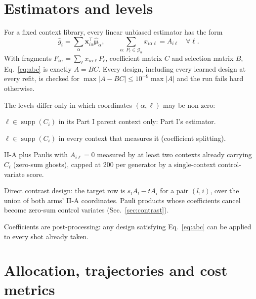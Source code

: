 \documentclass[10.5pt]{article}
\newcommand{\supp}{\operatorname{supp}}
\begin{document}
\section{Estimators and levels}
\label{sec:levels}

For a fixed context library, every linear unbiased estimator has the form
\begin{equation}
  \hat g_i=\sum_\alpha\bm x_{i\alpha}^{\!\top}\hat{\bm\mu}_\alpha,
  \qquad
  \sum_{\alpha:\,P_\ell\in\mathcal G_\alpha}x_{i\alpha\ell}=A_{i\ell}\quad\forall\ell .
  \label{eq:abc}
\end{equation}
With fragments $F_{i\alpha}=\sum_\ell x_{i\alpha\ell}P_\ell$, coefficient matrix $C$ and selection matrix $B$, Eq.~\eqref{eq:abc} is exactly $A=BC$. Every design, including every learned design at every refit, is checked for $\max|A-BC|\le10^{-9}\max|A|$ and the run fails hard otherwise.

The levels differ only in which coordinates $(\alpha,\ell)$ may be non-zero:
\begin{description}[leftmargin=3.4em,labelwidth=3em]
  \item[II-0] $\ell\in\supp(C_i)$ in its Part I parent context only: Part I's estimator.
  \item[II-A] $\ell\in\supp(C_i)$ in every context that measures it (coefficient splitting).
  \item[II-B] II-A plus Paulis with $A_{i\ell}=0$ measured by at least two contexts already carrying $C_i$ (zero-sum ghosts), capped at 200 per generator by a single-context control-variate score.
  \item[II-E] Direct contrast design: the target row is $s_lA_l-tA_i$ for a pair $(l,i)$, over the union of both arms' II-A coordinates. Pauli products whose coefficients cancel become zero-sum control variates (Sec.~\ref{sec:contrast}).
\end{description}
Coefficients are post-processing: any design satisfying Eq.~\eqref{eq:abc} can be applied to every shot already taken.

\section{Allocation, trajectories and cost metrics}
\label{sec:costs}
\end{document}
